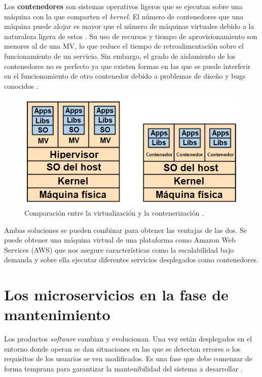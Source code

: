 \documentclass[11pt,spanish,listoffigures]{tfgetsinf}
\begin{document}
Los \textbf{contenedores} son sistemas operativos ligeros que se ejecutan sobre una máquina con la que comparten el \textit{kernel}. El número de contenedores que una máquina puede alojar es mayor que el número de máquinas virtuales debido a la naturaleza ligera de estos \cite{Dua2014}. Su uso de recursos y tiempo de aprovisionamiento son menores al de una MV, lo que reduce el tiempo de retroalimentación sobre el funcionamiento de un servicio. Sin embargo, el grado de aislamiento de los contenedores no es perfecto ya que existen formas en las que se puede interferir en el funcionamiento de otro contenedor debido a problemas de diseño y bugs conocidos \cite{Newman2015a}.

\begin{figure}[h]
\centering
\includegraphics[scale=0.8]{containers_vms_ES}
\caption{Comparación entre la virtualización y la contenerización \cite{Newman2015a}.}
\label{fig:containers_vms_ES}
\end{figure}

Ambas soluciones se pueden combinar para obtener las ventajas de las dos. Se puede obtener una máquina virtual de una plataforma como Amazon Web Services (AWS) que nos asegure características como la escalabilidad bajo demanda y sobre ella ejecutar diferentes servicios desplegados como contenedores.

\section{Los microservicios en la fase de mantenimiento}

Los productos \textit{software} cambian y evolucionan. Una vez están desplegados en el entorno donde operan se dan situaciones en las que se detectan errores o los requisitos de los usuarios se ven modificados. Es una fase que debe comenzar de forma temprana para garantizar la mantenibilidad del sistema a desarrollar \cite{Bourque2014}.
\end{document}
